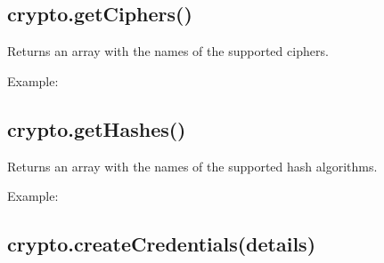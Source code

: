 \subsection{crypto.getCiphers()}\label{crypto.getciphers}

Returns an array with the names of the supported ciphers.

Example:

\begin{Shaded}
\begin{Highlighting}[]
 \NormalTok{();}
\end{Highlighting}
\end{Shaded}

\subsection{crypto.getHashes()}\label{crypto.gethashes}

Returns an array with the names of the supported hash algorithms.

Example:

\begin{Shaded}
\begin{Highlighting}[]
 \NormalTok{();}
\end{Highlighting}
\end{Shaded}

\subsection{crypto.createCredentials(details)}\label{crypto.createcredentialsdetails}

\begin{Shaded}
\begin{Highlighting}[]
 \NormalTok{- } \NormalTok{[}\NormalTok{][] }
\end{Highlighting}
\end{Shaded}

